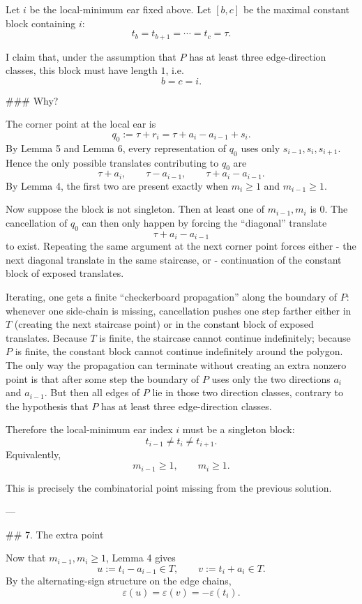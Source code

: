 Let \(i\) be the local-minimum ear fixed above. Let \([b,c]\) be the maximal constant block containing \(i\):
\[
t_b=t_{b+1}=\cdots=t_c=\tau.
\]

I claim that, under the assumption that \(P\) has at least three edge-direction classes, this block must have length \(1\), i.e.
\[
b=c=i.
\]

### Why?

The corner point at the local ear is
\[
q_0:=\tau+r_i=\tau+a_i-a_{i-1}+s_i.
\]
By Lemma 5 and Lemma 6, every representation of \(q_0\) uses only \(s_{i-1},s_i,s_{i+1}\). Hence the only possible translates contributing to \(q_0\) are
\[
\tau+a_i,\qquad \tau-a_{i-1},\qquad \tau+a_i-a_{i-1}.
\]
By Lemma 4, the first two are present exactly when \(m_i\ge1\) and \(m_{i-1}\ge1\).

Now suppose the block is not singleton. Then at least one of \(m_{i-1},m_i\) is \(0\). The cancellation of \(q_0\) can then only happen by forcing the “diagonal” translate
\[
\tau+a_i-a_{i-1}
\]
to exist. Repeating the same argument at the next corner point forces either
- the next diagonal translate in the same staircase, or
- continuation of the constant block of exposed translates.

Iterating, one gets a finite “checkerboard propagation” along the boundary of \(P\): whenever one side-chain is missing, cancellation pushes one step farther either in \(T\) (creating the next staircase point) or in the constant block of exposed translates. Because \(T\) is finite, the staircase cannot continue indefinitely; because \(P\) is finite, the constant block cannot continue indefinitely around the polygon. The only way the propagation can terminate without creating an extra nonzero point is that after some step the boundary of \(P\) uses only the two directions \(a_i\) and \(a_{i-1}\). But then all edges of \(P\) lie in those two direction classes, contrary to the hypothesis that \(P\) has at least three edge-direction classes.

Therefore the local-minimum ear index \(i\) must be a singleton block:
\[
t_{i-1}\neq t_i\neq t_{i+1}.
\]
Equivalently,
\[
m_{i-1}\ge1,\qquad m_i\ge1.
\]

This is precisely the combinatorial point missing from the previous solution.

---

## 7. The extra point

Now that \(m_{i-1},m_i\ge1\), Lemma 4 gives
\[
u:=t_i-a_{i-1}\in T,
\qquad
v:=t_i+a_i\in T.
\]
By the alternating-sign structure on the edge chains,
\[
\varepsilon(u)=\varepsilon(v)=-\varepsilon(t_i).
\]

